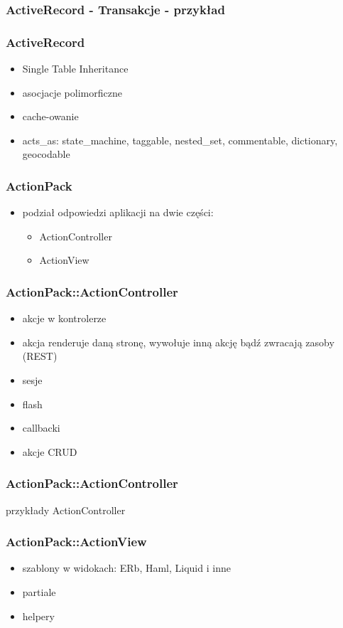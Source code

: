 \documentclass[12t]{beamer}
\begin{document}
\begin{frame}
  \frametitle{ActiveRecord - Transakcje - przykład}
  
\end{frame}

\begin{frame}
  \frametitle{ActiveRecord}
  \begin{itemize}
  \item Single Table Inheritance
  \item asocjacje polimorficzne
  \item cache-owanie
  \item acts\_as: state\_machine, taggable, nested\_set, commentable,
    dictionary, geocodable
  \end{itemize}
\end{frame}

\begin{frame}
  \frametitle{ActionPack}
  \begin{itemize}
  \item podział odpowiedzi aplikacji na dwie części:
    \begin{itemize}
    \item ActionController
    \item ActionView
    \end{itemize}
  \end{itemize}
\end{frame}

\begin{frame}
  \frametitle{ActionPack::ActionController}
  \begin{itemize}
  \item akcje w kontrolerze
  \item akcja renderuje daną stronę, wywołuje inną akcję bądź zwracają zasoby (REST)
  \item sesje
  \item flash
  \item callbacki
  \item akcje CRUD
  \end{itemize}
\end{frame}

\begin{frame}
  \frametitle{ActionPack::ActionController}
  przykłady ActionController
\end{frame}

\begin{frame}
  \frametitle{ActionPack::ActionView}
  \begin{itemize}
  \item szablony w widokach: ERb, Haml, Liquid i inne
  \item partiale
  \item helpery
  \end{itemize}
\end{frame}
\end{document}
